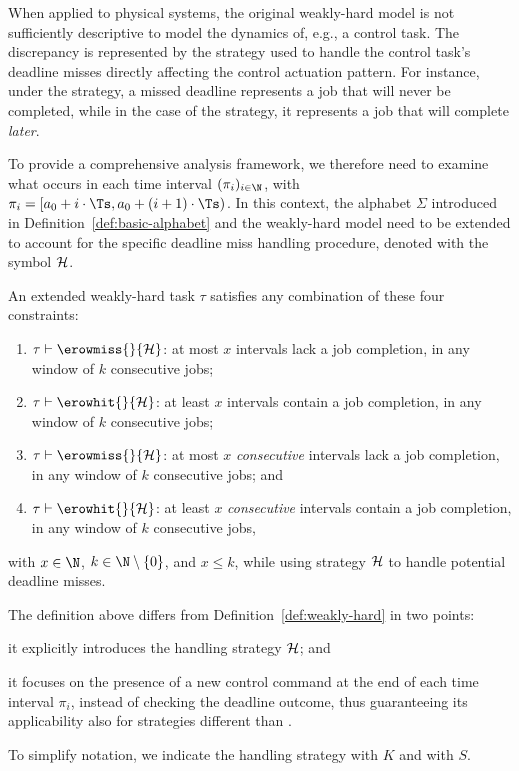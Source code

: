 When applied to physical systems, the original weakly-hard model is not sufficiently descriptive to model the dynamics of, e.g., a control task.
The discrepancy is represented by the strategy used to handle the control task's deadline misses directly affecting the control actuation pattern.
For instance, under the \tK{} strategy, a missed deadline represents a job that will never be completed, while in the case of the \tS{} strategy, it represents a job that will complete \emph{later}.

To provide a comprehensive analysis framework, we therefore need to examine what occurs in each time interval $(\pi_i)_{i \in \N}$, with $\pi_i = [a_0 + i\cdot \Ts, a_0 + (i+1)\cdot \Ts)$. 
In this context, the alphabet $\Sigma$ introduced in Definition~\ref{def:basic-alphabet} and the weakly-hard model need to be extended to account for the specific deadline miss handling procedure, denoted with the symbol $\mathcal{H}$.

\begin{definition}%
    \label{def:new-mk}%
    An extended weakly-hard task $\tau$ satisfies any combination of these four constraints:
    \begin{enumerate}[label=(\roman*)]
        \item $\tau \vdash \erowmiss{}{\strat}$: at most $x$ intervals lack a job completion, in any window of $k$ consecutive jobs;
        \item $\tau \vdash \erowhit{}{\strat}$: at least $x$ intervals contain a job completion, in any window of $k$ consecutive jobs;
        \item $\tau \vdash \erowmiss{}{\strat}$: at most $x$ \emph{consecutive} intervals lack a job completion, in any window of $k$ consecutive jobs; and
        \item $\tau \vdash \erowhit{}{\strat}$: at least $x$ \emph{consecutive} intervals contain a job completion, in any window of $k$ consecutive jobs,
    \end{enumerate}
    with $x\in \N$, $k \in \N\setminus \left\{ 0 \right\}$, and $x\leq k$, while using strategy $\mathcal{H}$ to handle potential deadline misses.
\end{definition}

The definition above differs from Definition~\ref{def:weakly-hard} in two points:
\begin{enumerate*}[label=(\roman*)]
    \item it explicitly introduces the handling strategy $\mathcal{H}$; and
    \item it focuses on the presence of a new control command at the end of each time interval $\pi_i$, instead of checking the deadline outcome, thus guaranteeing its applicability also for strategies different than \tK{}.
\end{enumerate*}
To simplify notation, we indicate the \tK{} handling strategy with $K$ and \tS{} with $S$.


